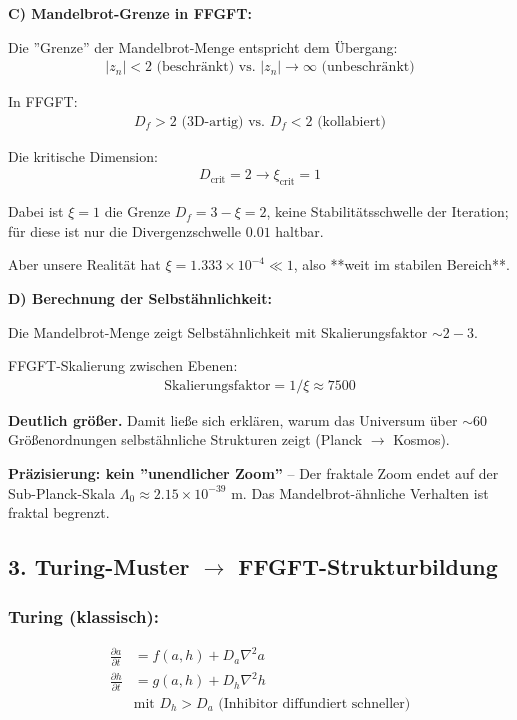 \textbf{C) Mandelbrot-Grenze in FFGFT:}

Die ''Grenze'' der Mandelbrot-Menge entspricht dem Übergang:
\begin{align*}
	|z_n| < 2 \text{ (beschränkt) vs. } |z_n| \to \infty \text{ (unbeschränkt)}
\end{align*}

In FFGFT:
\begin{align*}
	D_f > 2 \text{ (3D-artig) vs. } D_f < 2 \text{ (kollabiert)}
\end{align*}

Die kritische Dimension:
\begin{align*}
	D_{\text{crit}} = 2 \rightarrow \xi_{\text{crit}} = 1
\end{align*}

Dabei ist $\xi = 1$ die Grenze $D_f = 3-\xi = 2$, keine Stabilitätsschwelle der Iteration; für diese ist nur die Divergenzschwelle $0.01$ haltbar.

Aber unsere Realität hat $\xi = 1.333 \times 10^{-4} \ll 1$, also **weit im stabilen Bereich**.

\textbf{D) Berechnung der Selbstähnlichkeit:}

Die Mandelbrot-Menge zeigt Selbstähnlichkeit mit Skalierungsfaktor $\sim 2-3$.

FFGFT-Skalierung zwischen Ebenen:
\begin{align*}
	\text{Skalierungsfaktor} = 1/\xi \approx 7500
\end{align*}

\textbf{Deutlich größer.} Damit ließe sich erklären, warum das Universum über $\sim 60$ Größenordnungen selbstähnliche Strukturen zeigt (Planck $\to$ Kosmos).

\textbf{Präzisierung: kein ''unendlicher Zoom''} – Der fraktale Zoom endet auf der Sub-Planck-Skala $\Lambda_0 \approx 2.15 \times 10^{-39}$ m. Das Mandelbrot-ähnliche Verhalten ist fraktal begrenzt.

\subsection*{3. Turing-Muster $\rightarrow$ FFGFT-Strukturbildung}

\subsubsection*{Turing (klassisch):}
\begin{align*}
	\frac{\partial a}{\partial t} &= f(a,h) + D_a \nabla^2 a \\
	\frac{\partial h}{\partial t} &= g(a,h) + D_h \nabla^2 h \\
	&\text{mit } D_h > D_a \text{ (Inhibitor diffundiert schneller)}
\end{align*}

